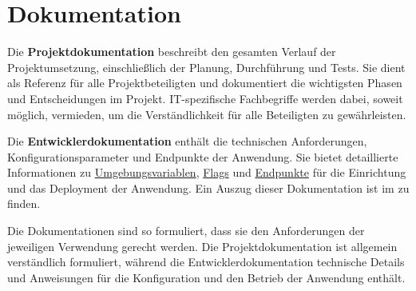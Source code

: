 \section{Dokumentation}
\label{sec:Dokumentation}

Die \textbf{Projektdokumentation} beschreibt den gesamten Verlauf der Projektumsetzung, einschließlich der Planung, Durchführung und Tests. Sie dient als Referenz für alle Projektbeteiligten und dokumentiert die wichtigsten Phasen und Entscheidungen im Projekt. IT-spezifische Fachbegriffe werden dabei, soweit möglich, vermieden, um die Verständlichkeit für alle Beteiligten zu gewährleisten.

Die \textbf{Entwicklerdokumentation} enthält die technischen Anforderungen, Konfigurationsparameter und Endpunkte der Anwendung. Sie bietet detaillierte Informationen zu \hyperlink{Umgebungsvariablen}{\textcolor{AOBlau}{Umgebungsvariablen}}, \hyperlink{Flags}{\textcolor{AOBlau}{Flags}} und \hyperlink{Endpoints}{\textcolor{AOBlau}{Endpunkte}} für die Einrichtung und das Deployment der Anwendung. Ein Auszug dieser Dokumentation ist im  zu finden.

Die Dokumentationen sind so formuliert, dass sie den Anforderungen der jeweiligen Verwendung gerecht werden. Die Projektdokumentation ist allgemein verständlich formuliert, während die Entwicklerdokumentation technische Details und Anweisungen für die Konfiguration und den Betrieb der Anwendung enthält.
